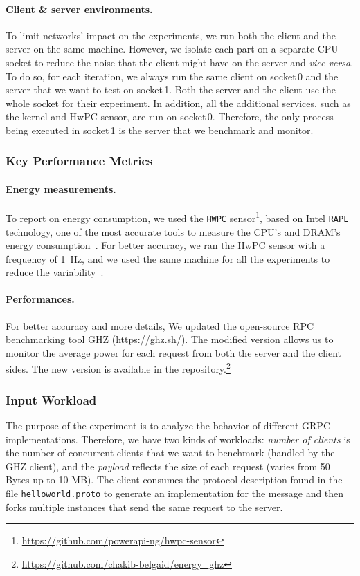 \paragraph{Client \& server environments.}
To limit networks' impact on the experiments, we run both the client and the server on the same machine.
However, we isolate each part on a separate CPU socket to reduce the noise that the client might have on the server and \emph{vice-versa}.
To do so, for each iteration, we always run the same client on \textsf{socket\,0} and the server that we want to test on \textsf{socket\,1}.
Both the server and the client use the whole socket for their experiment.
In addition, all the additional services, such as the kernel and HwPC sensor, are run on \textsf{socket\,0}.
Therefore, the only process being executed in \textsf{socket\,1} is the server that we benchmark and monitor.

\subsubsection{Key Performance Metrics}
\paragraph{Energy measurements.}
To report on energy consumption, we used the \texttt{HWPC} sensor\footnote{\url{https://github.com/powerapi-ng/hwpc-sensor}}, based on Intel \texttt{RAPL} technology, one of the most accurate tools to measure the CPU's and DRAM's energy consumption~\cite{hackenberg2013power,hackenberg2015energy}.
For better accuracy, we ran the HwPC sensor with a frequency of 1~Hz, and we used the same machine for all the experiments to reduce the variability~\cite{ilsche_power_2015}.

\paragraph{Performances.}
For better accuracy and more details, We updated the open-source RPC benchmarking tool GHZ (\url{https://ghz.sh/}).
The modified version allows us to monitor the average power for each request from both the server and the client sides.
The new version is available in the repository.\footnote{\url{https://github.com/chakib-belgaid/energy_ghz}}

\subsubsection{Input Workload}
The purpose of the experiment is to analyze the behavior of different GRPC implementations.
Therefore, we have two kinds of workloads: \emph{number of clients} is the number of concurrent clients that we want to benchmark (handled by the GHZ client), and the \emph{payload} reflects the size of each request (varies from 50 Bytes up to 10 MB).
The client consumes the protocol description found in the file \texttt{helloworld.proto} to generate an implementation for the message and then forks multiple instances that send the same request to the server.

